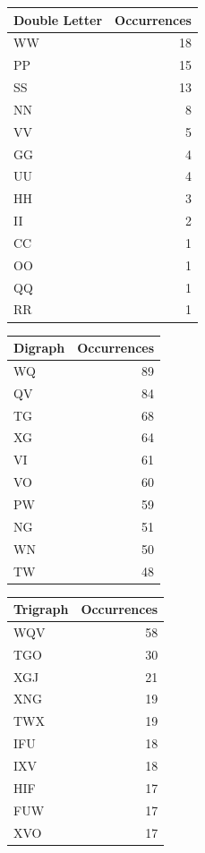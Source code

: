 \documentclass[a4paper,12pt]{article}
\begin{document}
\begin{table}[htbp]
\label{tab:org876b8db}
\centering
\begin{tabular}{lr}
Double Letter & Occurrences\\
\hline
WW & 18\\
PP & 15\\
SS & 13\\
NN & 8\\
VV & 5\\
GG & 4\\
UU & 4\\
HH & 3\\
II & 2\\
CC & 1\\
OO & 1\\
QQ & 1\\
RR & 1\\
\end{tabular}
\end{table}

\begin{table}[htbp]
\label{tab:org0dd7502}
\centering
\begin{tabular}{lr}
Digraph & Occurrences\\
\hline
WQ & 89\\
QV & 84\\
TG & 68\\
XG & 64\\
VI & 61\\
VO & 60\\
PW & 59\\
NG & 51\\
WN & 50\\
TW & 48\\
\end{tabular}
\end{table}

\begin{table}[htbp]
\label{tab:org8d277f9}
\centering
\begin{tabular}{lr}
Trigraph & Occurrences\\
\hline
WQV & 58\\
TGO & 30\\
XGJ & 21\\
XNG & 19\\
TWX & 19\\
IFU & 18\\
IXV & 18\\
HIF & 17\\
FUW & 17\\
XVO & 17\\
\end{tabular}
\end{table}
\end{document}
